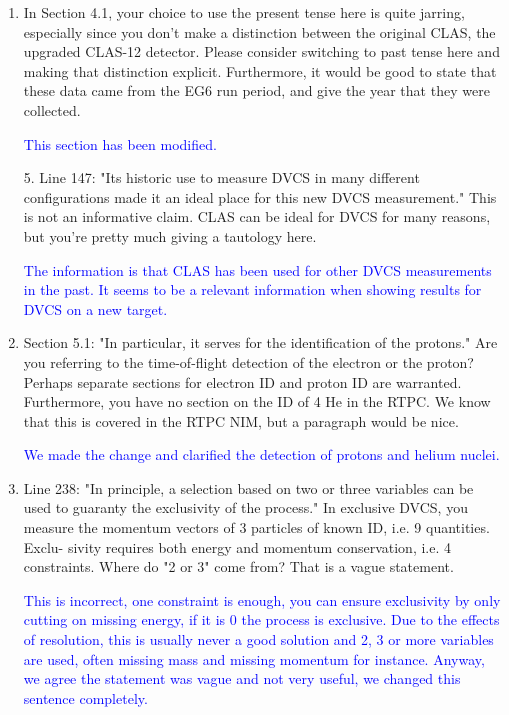 \documentclass[a4paper,11pt,twoside]{article}
\begin{document}
\begin{enumerate}
\item  In Section 4.1, your choice to use the present tense here is quite jarring, especially since you don't make a
distinction between the original CLAS, the upgraded CLAS-12 detector. Please consider switching to past
tense here and making that distinction explicit. Furthermore, it would be good to state that these data came
from the EG6 run period, and give the year that they were collected.

   \textcolor{blue}{This section has been modified.}

5. Line 147: "Its historic use to measure DVCS in many different configurations made it an ideal place for this
new DVCS measurement."
This is not an informative claim. CLAS can be ideal for DVCS for many reasons, but you're pretty much
giving a tautology here.

   \textcolor{blue}{The information is that CLAS has been used for other DVCS measurements in the past. It seems
to be a relevant information when showing results for DVCS on a new target.}

\item  Section 5.1: "In particular, it serves for the identification of the protons."
Are you referring to the time-of-flight detection of the electron or the proton? Perhaps separate sections for
electron ID and proton ID are warranted. Furthermore, you have no section on the ID of 4 He in the RTPC.
We know that this is covered in the RTPC NIM, but a paragraph would be nice.

   \textcolor{blue}{We made the change and clarified the detection of protons and helium nuclei.}

\item  Line 238: "In principle, a selection based on two or three variables can be used to guaranty the exclusivity of
the process."
In exclusive DVCS, you measure the momentum vectors of 3 particles of known ID, i.e. 9 quantities. Exclu-
sivity requires both energy and momentum conservation, i.e. 4 constraints. Where do "2 or 3" come from?
That is a vague statement.

   \textcolor{blue}{This is incorrect, one constraint is enough, you can ensure exclusivity by only cutting on missing 
energy, if it is 0 the process is exclusive. Due to the effects of resolution, this is usually never a good solution
and 2, 3 or more variables are used, often missing mass and missing momentum for instance. Anyway, we agree the statement was 
vague and not very useful, we changed this sentence completely.}


\end{enumerate}
\end{document}
